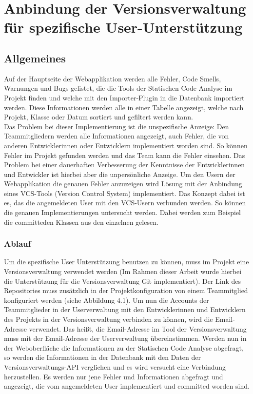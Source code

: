 \section{Anbindung der Versionsverwaltung für spezifische User-Unterstützung}
\subsection{Allgemeines}
Auf der Hauptseite der Webapplikation werden alle Fehler, Code Smells, Warnungen und Bugs gelistet, die die Tools der Statischen Code Analyse im Projekt finden und welche mit den Importer-Plugin in die Datenbank importiert werden. Diese Informationen werden alle in einer Tabelle angezeigt, welche nach Projekt, Klasse oder Datum sortiert und gefiltert werden kann. \\
Das Problem bei dieser Implementierung ist die unspezifische Anzeige: Den Teammitgliedern werden alle Informationen angezeigt, auch Fehler, die von anderen Entwicklerinnen oder Entwicklern implementiert worden sind. So können  Fehler im Projekt gefunden werden und das Team kann die Fehler einsehen. Das Problem bei einer dauerhaften Verbesserung der Kenntnisse der Entwicklerinnen und Entwickler ist hierbei aber die unpersönliche Anzeige. Um den Usern der Webapplikation die genauen Fehler anzuzeigen wird Lösung mit der Anbindung eines VCS-Tools (Version Control System) implementiert. Das Konzept dabei ist es, das die angemeldeten User mit den VCS-Usern verbunden werden. So können die genauen Implementierungen untersucht werden. Dabei werden zum Beispiel die committeden Klassen aus den einzelnen gelesen.
\subsubsection{Ablauf}
Um die spezifische User Unterstützung benutzen zu können, muss im Projekt eine Versionsverwaltung verwendet werden (Im Rahmen dieser Arbeit wurde hierbei die Unterstützung für die Versionsverwaltung Git implementiert). Der Link des Repositories muss zusätzlich in der Projektkonfiguration von einem Teammitglied konfiguriert werden (siehe Abbildung 4.1). Um nun die Accounts der Teammitglieder in der Userverwaltung mit den Entwicklerinnen und Entwicklern des Projekts in der Versionsverwaltung verbinden zu können, wird die Email-Adresse verwendet. Das heißt, die Email-Adresse im Tool der Versionsverwaltung muss mit der Email-Adresse der Userverwaltung übereinstimmen. Werden nun in der Weboberfläche die Informationen zu der Statischen Code Analyse abgefragt, so werden die Informationen in der Datenbank mit den Daten der Versionsverwaltungs-API verglichen und es wird versucht eine Verbindung herzustellen. Es werden nur jene Fehler und Informationen abgefragt und angezeigt, die vom angemeldeten User implementiert und committed worden sind.   
